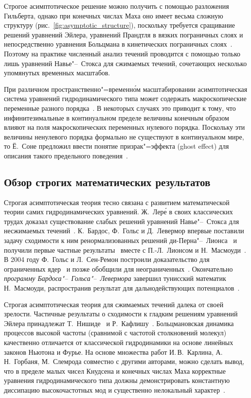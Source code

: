 Строгое асимптотическое решение можно получить с помощью разложения Гильберта,
однако при конечных числах Маха оно имеет весьма сложную структуру (рис.~\ref{fig:asymptotic_structure}),
поскольку требуется сращивание решений уравнений Эйлера, уравнений Прандтля в вязких пограничных слоях
и непосредственно уравнения Больцмана в кинетических пограничных слоях~\cite{Sone2000}.
Поэтому на практике численный анализ течений проводится с помощью только лишь уравнений Навье"--~Стокса для сжимаемых течений,
сочетающих несколько упомянутых временных масштабов.

При различном пространственно"=временн\'{о}м масштабировании асимптотическая система уравнений гидродинамического типа
может содержать макроскопические переменные разного порядка~\cite{Bardos2008}.
В некоторых случаях это приводит к тому, что инфинитезимальные в континуальном пределе величины
конечным образом влияют на поля макроскопических переменных нулевого порядка.
Поскольку эти величины ненулевого порядка формально не существуют в континуальном мире,
то Ё.~Соне предложил ввести понятие призрак"=эффекта (ghost effect) для описания такого предельного поведения~\cite{Sone2000ghost}.

\subsection{Обзор строгих математических результатов}

Строгая асимптотическая теория тесно связана с развитием математической теории самих гидродинамических уравнений.
Ж.~Лер\'{е} в своих классических трудах доказал существование слабых решений уравнений Навье"--~Стокса
для несжимаемых течений~\cite{Leray1934}.
К.~Бардос, Ф.~Гольс и Д.~Левермор впервые поставили задачу сходимости к ним ренормализованных решений ди-Перна"--~Лионса~\cite{Bardos1991}
и получили первые частные результаты~\cite{Bardos1993} вместе с П.-Л.~Лионсом и Н.~Масмоуди~\cite{Masmoudi2001}.
В 2004 году Ф.~Гольс и Л.~Сен-Ремон построили доказательство для ограниченных ядер~\cite{Golse2004}
и позже обобщили для неограниченных~\cite{Golse2009}.
Окончательно \emph{программу Бардоса"--~Гольса"--~Левермора} завершил тунисский математик Н.~Масмоуди,
распространив результат для дальнодействующих потенциалов~\cite{Masmoudi2010}.

Строгая асимптотическая теория для сжимаемых течений далека от своей зрелости.
Частичные результаты о сходимости к гладким решениям уравнений Эйлера принадлежат
Т.~Нишиде~\cite{Nishida1978} и Р.~Кафлишу~\cite{Caflisch1980limit}.
Больцмановская динамика процессов высокой частоты (сравнимой с частотой столкновений молекул)
качественно отличается от классической гидродинамики на основе линейных законов Ньютона и Фурье.
На основе множества работ И.\,В.~Карлина, А.\,Н.~Горбаня, М.~Слемрода совместно с другими авторами,
можно сделать вывод, что в пределе малых чисел Кнудсена и конечных числах Маха корректные уравнения
гидродинамического типа должны демонстрировать константную диссипацию высокочастотных мод
и существенно нелокальный характер~\cite{Gorban2014}.

